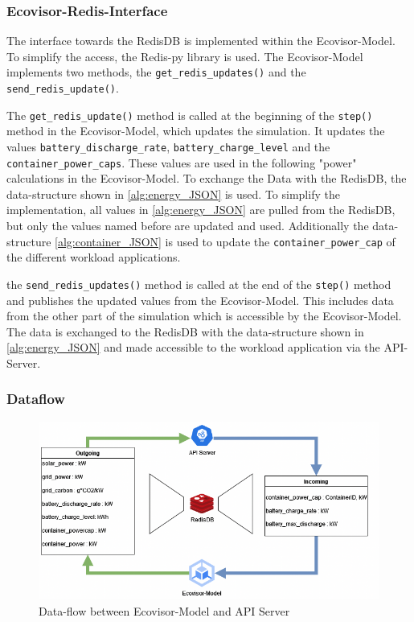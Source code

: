 \subsubsection{Ecovisor-Redis-Interface}
The interface towards the RedisDB is implemented within the Ecovisor-Model. To simplify the access, the Redis-py library \cite{Redis-py} is used. The Ecovisor-Model implements two methods, the \texttt{get\_redis\_updates()} and the \texttt{send\_redis\_update()}.

The \texttt{get\_redis\_update()} method is called at the beginning of the \texttt{step()} method in the Ecovisor-Model, which updates the simulation. It updates the values \texttt{battery\_discharge\_rate}, \texttt{battery\_charge\_level} and the \texttt{container\_power\_caps}. These values are used in the following "power" calculations in the Ecovisor-Model. To exchange the Data with the RedisDB, the data-structure shown in \ref{alg:energy_JSON} is used. To simplify the implementation, all values in \ref{alg:energy_JSON} are pulled from the RedisDB, but only the values named before are updated and used. Additionally the data-structure \ref{alg:container_JSON} is used to update the \texttt{container\_power\_cap} of the different workload applications.

the \texttt{send\_redis\_updates()} method is called at the end of the \texttt{step()} method and  publishes the updated values from the Ecovisor-Model. This includes data from the other part of the simulation which is accessible by the Ecovisor-Model.
The data is exchanged to the RedisDB with the data-structure shown in \ref{alg:energy_JSON} and made accessible to the workload application via the API-Server.

\subsubsection{Dataflow}
\label{subsec:dataflow}
\begin{figure}
    \centering
    \includegraphics[width=\linewidth]{figures/Dataflow.drawio.png}
    \caption{Data-flow between Ecovisor-Model and API Server}
    \label{fig:dataflow}
\end{figure}

